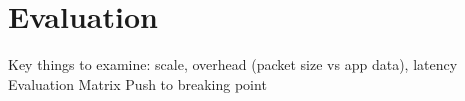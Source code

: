 \chapter{Evaluation}
Key things to examine: scale, overhead (packet size vs app data), latency
Evaluation Matrix
Push to breaking point